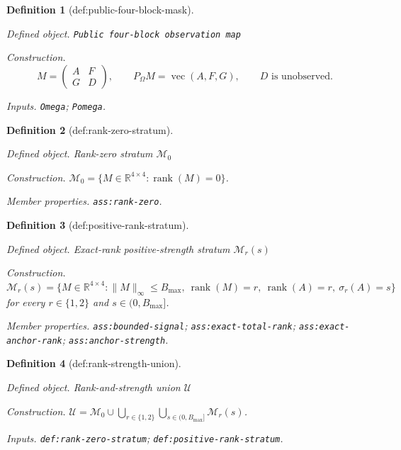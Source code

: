 \documentclass{article}
\newtheorem{definition}{Definition}
\begin{document}
\begin{definition}[def:public-four-block-mask]\label{def:public-four-block-mask}
\par\smallskip\noindent\emph{Defined object.} \texttt{Public four-\allowbreak{}block observation map}
\par\smallskip\noindent\emph{Construction.} \[M=\begin{pmatrix}A&F\\G&D\end{pmatrix},\qquad P_{\Omega}M=\operatorname{vec}(A,F,G),\qquad D\text{ is unobserved}.\]
\par\smallskip\noindent\emph{Inputs.} \texttt{Omega}; \texttt{Pomega}.
\end{definition}

\begin{definition}[def:rank-zero-stratum]\label{def:rank-zero-stratum}
\par\smallskip\noindent\emph{Defined object.} Rank-zero stratum \(\mathcal M_0\)
\par\smallskip\noindent\emph{Construction.} \(\mathcal M_0=\{M\in\mathbb R^{4\times4}:\operatorname{rank}(M)=0\}\).
\par\smallskip\noindent\emph{Member properties.} \texttt{ass:\allowbreak{}rank-\allowbreak{}zero}.
\end{definition}

\begin{definition}[def:positive-rank-stratum]\label{def:positive-rank-stratum}
\par\smallskip\noindent\emph{Defined object.} Exact-rank positive-strength stratum \(\mathcal M_r(s)\)
\par\smallskip\noindent\emph{Construction.} \(\mathcal M_r(s)=\{M\in\mathbb R^{4\times4}:\lVert M\rVert_{\infty}\le B_{\max},\ \operatorname{rank}(M)=r,\ \operatorname{rank}(A)=r,\ \sigma_r(A)=s\}\) for every \(r\in\{1,2\}\) and \(s\in(0,B_{\max}]\).
\par\smallskip\noindent\emph{Member properties.} \texttt{ass:\allowbreak{}bounded-\allowbreak{}signal}; \texttt{ass:\allowbreak{}exact-\allowbreak{}total-\allowbreak{}rank}; \texttt{ass:\allowbreak{}exact-\allowbreak{}anchor-\allowbreak{}rank}; \texttt{ass:\allowbreak{}anchor-\allowbreak{}strength}.
\end{definition}

\begin{definition}[def:rank-strength-union]\label{def:rank-strength-union}
\par\smallskip\noindent\emph{Defined object.} Rank-and-strength union \(\mathcal U\)
\par\smallskip\noindent\emph{Construction.} \(\mathcal U=\mathcal M_0\cup\bigcup_{r\in\{1,2\}}\bigcup_{s\in(0,B_{\max}]}\mathcal M_r(s)\).
\par\smallskip\noindent\emph{Inputs.} \texttt{def:\allowbreak{}rank-\allowbreak{}zero-\allowbreak{}stratum}; \texttt{def:\allowbreak{}positive-\allowbreak{}rank-\allowbreak{}stratum}.
\end{definition}
\end{document}
